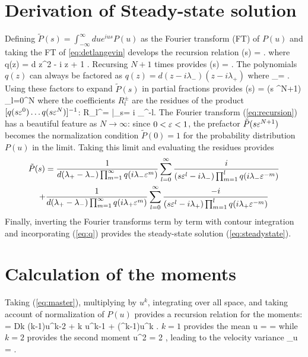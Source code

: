 \section{Derivation of Steady-state solution}

Defining $\tilde{P}(s) = \int_{-\infty}^\infty du e^{i u s} P(u) $ as the Fourier transform (FT) of $P(u)$ and taking the FT of \ref{eq:detlangevin} develops the recursion relation
\be {}(s) = . \ee
where
\be q(z) = d z^2 - i \gamma z + 1 . \label{eq:q} \ee
Recursing $N+1$ times provides
\be {}(s) = .\label{eq:recursion}\ee
The polynomials $q(z)$ can always be factored as $q(z) = d(z - i\lambda_-)(z - i\lambda_+)$ where
\be \lambda_\pm = .\ee
Using these factors to expand $\tilde{P}(s)$ in partial fractions provides
\be {}(s)  = (s \ve^{N+1}) \sum_{l=0}^N   \ee
where the coefficients $R_l^\pm$ are the residues of the product $[q(s\varepsilon^0)\dots q(s\varepsilon^N)]^{-1}$:
\be R_l^\pm =  \Big|_{s= i \lambda_\pm \ve^{-l}}.\ee
The Fourier transform (\ref{eq:recursion}) has a beautiful feature as $N\rightarrow \infty$: since $0<\varepsilon <1$, the prefactor $\tilde{P}( s \varepsilon^{N+1})$ becomes the normalization condition $\tilde{P}(0)=1$ for the probability distribution $P(u)$ in the limit.
Taking this limit and evaluating the residues provides 
\begin{multline} \tilde{P}(s) = \frac{1}{d(\lambda_+ - \lambda_-) \prod_{m=1}^\infty q(i \lambda_- \varepsilon^m)} \sum_{l=0}^\infty \frac{i}{(s\varepsilon^l-i\lambda_-)\prod_{m=1}^l q(i\lambda_- \varepsilon^{-m})} 
	\\+ \frac{1}{d(\lambda_+ - \lambda_-) \prod_{m=1}^\infty q(i \lambda_+ \varepsilon^m)} \sum_{l=0}^\infty \frac{-i}{(s\varepsilon^l-i \lambda_+)\prod_{m=1}^l q(i\lambda_+ \varepsilon^{-m})} \end{multline}
Finally, inverting the Fourier transforms term by term with contour integration and incorporating (\ref{eq:q}) provides the steady-state solution (\ref{eq:steadystate}).

\section{Calculation of the moments}
Taking (\ref{eq:master}), multiplying by $u^k$, integrating over all space, and taking account of normalization of $P(u)$ provides a recursion relation for the moments: 
 = Dk (k-1)\langle u^{k-2} \rangle + \Gamma k \langle u^{k-1} \rangle + \nu (\ve^k-1)\langle u^k \rangle. \ee
$k=1$ provides the mean
\be \langle u \rangle =  = \ee
while $k=2$ provides the second moment
\be \langle u^2 \rangle = 2 , \ee
leading to the velocity variance
\be \sigma_u = .\ee
